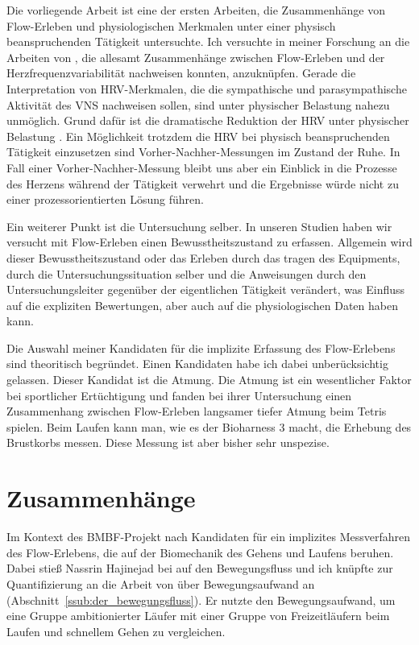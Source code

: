 Die vorliegende Arbeit ist eine der ersten Arbeiten, die Zusammenhänge von Flow-Erleben und physiologischen Merkmalen unter einer physisch beanspruchenden Tätigkeit untersuchte. Ich versuchte in meiner Forschung an die Arbeiten von \citet{deManzano2010, Keller2011, Gaggioli2013, Peifer2014, Tozman2015}, die allesamt Zusammenhänge zwischen Flow-Erleben und der Herzfrequenzvariabilität nachweisen konnten, anzuknüpfen. Gerade die Interpretation von \ac{HRV}-Merkmalen, die die sympathische und parasympathische Aktivität des \acs{VNS} nachweisen sollen, sind unter physischer Belastung nahezu unmöglich. Grund dafür ist die dramatische Reduktion der \ac{HRV} unter physischer Belastung \citep{Hoos2010}. Ein Möglichkeit trotzdem die \ac{HRV} bei physisch beanspruchenden Tätigkeit einzusetzen sind Vorher-Nachher-Messungen im Zustand der Ruhe. In Fall einer Vorher-Nachher-Messung bleibt uns aber ein Einblick in die Prozesse des Herzens während der Tätigkeit verwehrt und die Ergebnisse würde nicht zu einer prozessorientierten Lösung führen. 	
	
Ein weiterer Punkt ist die Untersuchung selber. In unseren Studien haben wir versucht mit Flow-Erleben einen Bewusstheitszustand zu erfassen. Allgemein wird dieser Bewusstheitszustand oder das Erleben durch das tragen des Equipments, durch die Untersuchungssituation selber und die Anweisungen durch den Untersuchungsleiter gegenüber der eigentlichen Tätigkeit verändert, was Einfluss auf die expliziten Bewertungen, aber auch auf die physiologischen Daten haben kann.

Die Auswahl meiner Kandidaten für die implizite Erfassung des Flow-Erlebens sind theoritisch begründet. Einen Kandidaten habe ich dabei unberücksichtig gelassen. Dieser Kandidat ist die Atmung. Die Atmung ist ein wesentlicher Faktor bei sportlicher Ertüchtigung und \citet{Harmat2015} fanden bei ihrer Untersuchung einen Zusammenhang zwischen Flow-Erleben langsamer tiefer Atmung beim Tetris spielen. Beim Laufen kann man, wie es der Bioharness 3 macht, die Erhebung des Brustkorbs messen. Diese Messung ist aber bisher sehr unspezise. 


\section{Zusammenhänge} %
\label{sec:zusammenhange}

Im Kontext des \acs{BMBF}-Projekt nach Kandidaten für ein implizites Messverfahren des Flow-Erlebens, die auf der Biomechanik des Gehens und Laufens beruhen. Dabei stieß Nassrin Hajinejad bei \citet[][S.~121]{Meinel2007} auf den Bewegungsfluss und ich knüpfte zur Quantifizierung an die Arbeit von \citet{Hreljac2000} über Bewegungsaufwand an (Abschnitt~\ref{ssub:der_bewegungsfluss}). Er nutzte den Bewegungsaufwand, um eine Gruppe ambitionierter Läufer mit einer Gruppe von Freizeitläufern beim Laufen und schnellem Gehen zu vergleichen. 

